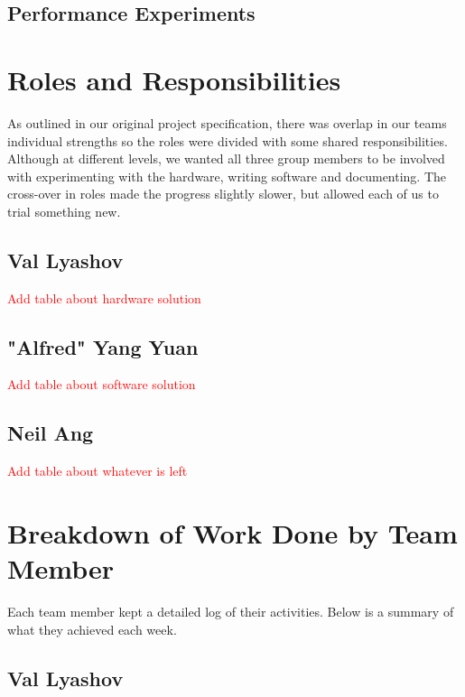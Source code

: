 \documentclass[11pt,a4paper,titlepage]{report}
\begin{document}
\subsection{Performance Experiments}

\section{Roles and Responsibilities}

As outlined in our original project specification, there was overlap in our teams individual strengths so the roles were divided with some shared responsibilities. Although at different levels, we wanted all three group members to be involved with experimenting with the hardware, writing software and documenting. The cross-over in roles made the progress slightly slower, but allowed each of us to trial something new.

\subsection{Val Lyashov}

\textcolor{red}{Add table about hardware solution}

\subsection{"Alfred" Yang Yuan}

\textcolor{red}{Add table about software solution}

\subsection{Neil Ang}

\textcolor{red}{Add table about whatever is left}


\section{Breakdown of Work Done by Team Member}

Each team member kept a detailed log of their activities. Below is a summary of what they achieved each week.

\subsection{Val Lyashov}
\end{document}
